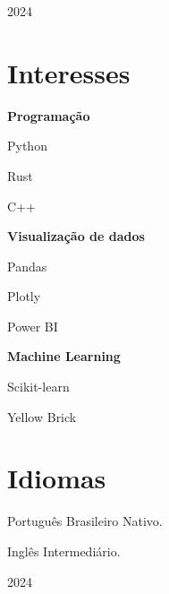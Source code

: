 \documentclass[12pt]{article}
\newcommand{\cvsection}[1]{\section*{\rmfamily#1}}
\begin{document}
\vfill
\begin{center}
    \Large 2024
\end{center}

\newpage
\indent

\cvsection{Interesses}
\indent

{\large

\textbf{Programação}

\hspace{2em}Python

\hspace{2em}Rust

\hspace{2em}C++

\textbf{Visualização de dados}

\hspace{2em}Pandas

\hspace{2em}Plotly

\hspace{2em}Power BI

\textbf{Machine Learning}

\hspace{2em}Scikit-learn

\hspace{2em}Yellow Brick



}

\indent
\cvsection{Idiomas}
\indent

{\large

Português Brasileiro Nativo.

Inglês Intermediário.

}

\vfill
\begin{center}
    \Large 2024
\end{center}
\end{document}
